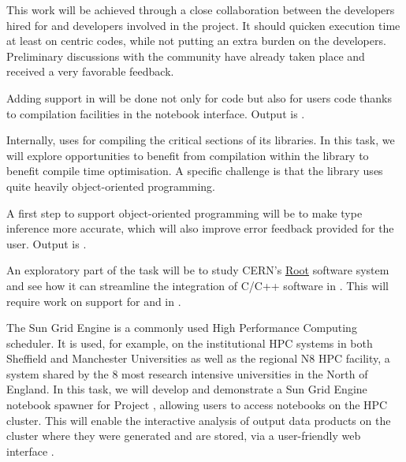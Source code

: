 \begin{workpackage}
\begin{tasklist}
\begin{task}[title=Pythran,id=pythran,lead=LL,partners={UJF,UO},PM=26, wphases=0-24, issue=105]
  This work will be achieved through a close collaboration between the \Pythran
  developers hired for \TheProject and \Cython developers involved in the \Sage
  project. It should quicken \Sage execution time at least on \Numpy centric
  codes, while not putting an extra burden on the developers.  Preliminary
  discussions with the \Cython community have already taken place and received a
  very favorable feedback.

  Adding \Pythran support in \Sage will be done not only for \Sage code but also
  for \Sage users code thanks to compilation facilities in the notebook interface.
  Output is .


  Internally, \Sage uses \Cython for compiling the critical sections of
  its libraries. In this task, we will explore opportunities to
  benefit from \Pythran compilation within the \Sage library to benefit
  \Pythran compile time optimisation. A specific challenge is that the \Sage
  library uses quite heavily object-oriented programming.

  A first step to support object-oriented programming will be to make
  \Pythran type inference more accurate, which will also improve error
  feedback provided for the user. Output is .

  An exploratory part of the task will be to study CERN's \href{https://root.cern.ch/}{Root}
  software system and see how it can streamline the integration of C/C++ software in \Sage.
  This will require work on support for \clang and \cling in
  .
\end{task}

\begin{task}[title=Sun Grid Engine Integration in Project \Jupyter Hub, lead=USH,id=hpc-jupyter,PM=12,wphases=0-12,issue=106]
The Sun Grid Engine is a commonly used High Performance Computing
scheduler. It is used, for example, on the institutional HPC systems
in both Sheffield and Manchester Universities as well as the regional
N8 HPC facility, a system shared by the 8 most research intensive
universities in the North of England. In this task, we will develop
and demonstrate a Sun Grid Engine notebook spawner for Project
\Jupyter, allowing users to access \Jupyter notebooks on the HPC
cluster. This will enable the interactive analysis of output data
products on the cluster where they were generated and are stored, via
a user-friendly web interface .
\end{task}
\end{tasklist}


\end{workpackage}
